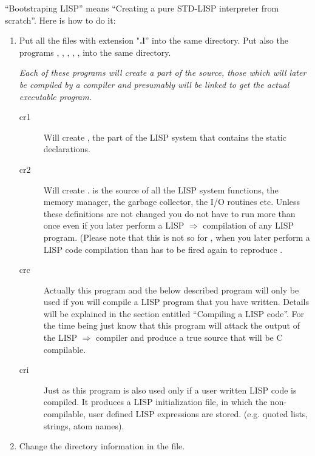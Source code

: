 ``Bootstraping LISP'' means ``Creating a  pure  STD-LISP  interpreter  from
scratch''. Here is how to do it:
\begin{enumerate}
\item
      Put all the files with extension "{\bf .l}'' into the same directory.
      Put also the \C programs , , ,
      , ,  into the same directory.

      {\em
        Each of these \C programs will create a part of the \C source,
       those
       which  will later  be compiled by a \C compiler and presumably
       will be linked to get the actual executable program.
        \begin{description}
  \item[cr1] Will create , the part of the LISP system
                     that contains the static declarations.
  \item[cr2] Will  create  .  is the
                     source of
                     all the LISP system  functions, the memory manager,
                     the garbage collector, the I/O routines etc.
                     Unless these definitions are not changed you do
                     not have to run  more than once even if you
                     later perform a LISP $\Rightarrow$ \CC compilation
                     of any LISP program.
                     (Please note that this is not so for ,
                     when you later perform a LISP code compilation than
                      has to be fired again to reproduce
                     .
  \item[crc] Actually this program and the below described program
                     will only be used if you will compile a LISP program
                     that you have written. Details will be explained
                     in the section entitled  ``Compiling a LISP code''.
                     For the time being just know that this program will
                     attack the output of the LISP $\Rightarrow$ \C
                     compiler and produce a true \C source that will be
                     C compilable.
  \item[cri] Just as   this program is also used only
                     if a user written LISP code is compiled. It produces
                     a   LISP   initialization   file,   in    which    the
                     non-compilable, user defined  LISP expressions are stored.
                     (e.g. quoted lists, strings, atom names).
        \end{description}
      }
\item
      Change the directory information in the   file.


\end{enumerate}
